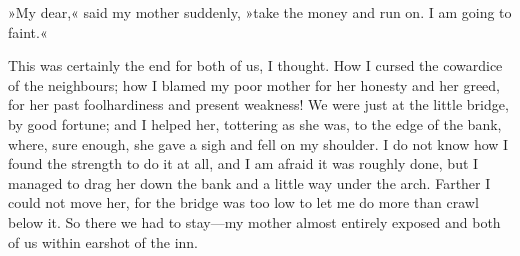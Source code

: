 »My dear,« said my mother suddenly, »take the money and run on. I am going to faint.«

This was certainly the end for both of us, I thought. How I cursed the cowardice of the neighbours; how I blamed my poor mother for her honesty and her greed, for her past foolhardiness and present weakness! We were just at the little bridge, by good fortune; and I helped her, tottering as she was, to the edge of the bank, where, sure enough, she gave a sigh and fell on my shoulder. I do not know how I found the strength to do it at all, and I am afraid it was roughly done, but I managed to drag her down the bank and a little way under the arch. Farther I could not move her, for the bridge was too low to let me do more than crawl below it. So there we had to stay—my mother almost entirely exposed and both of us within earshot of the inn.
